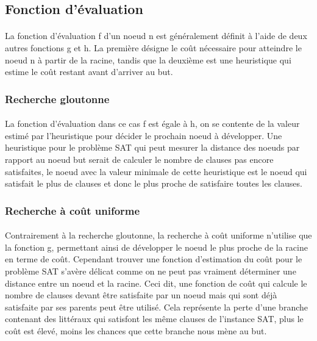 \subsection{Fonction d'évaluation}
\paragraph{}
La fonction d’évaluation f d’un noeud n est généralement définit à l’aide de deux autres fonctions g et h. La première désigne le coût nécessaire pour atteindre le noeud n à partir de la racine, tandis que la deuxième est une heuristique qui estime le coût restant avant d’arriver au but.
\subsubsection{Recherche gloutonne}
\paragraph{}
La fonction d’évaluation dans ce cas f est égale à h, on se contente de la valeur estimé par l’heuristique pour décider le prochain noeud à développer. Une heuristique pour le problème SAT qui peut mesurer la distance des noeuds par rapport au noeud but serait de calculer le nombre de clauses pas encore satisfaites, le noeud avec la valeur minimale de cette heuristique est le noeud qui satisfait le plus de clauses et donc le plus proche de satisfaire toutes les clauses.
\subsubsection{Recherche à coût uniforme}
\paragraph{}
Contrairement à la recherche gloutonne, la recherche à coût uniforme n’utilise que la fonction g, permettant ainsi de développer le noeud le plus proche de la racine en terme de coût. Cependant trouver une fonction d’estimation du coût pour le problème SAT s’avère délicat comme on ne peut pas vraiment déterminer une distance entre un noeud et la racine. Ceci dit, une fonction de coût qui calcule le nombre de clauses devant être satisfaite par un noeud mais qui sont déjà satisfaite par ses parents peut être utilisé. Cela représente la perte d’une branche contenant des littéraux qui satisfont les même clauses de l’instance SAT, plus le coût est élevé, moins les chances que cette branche nous mène au but.

